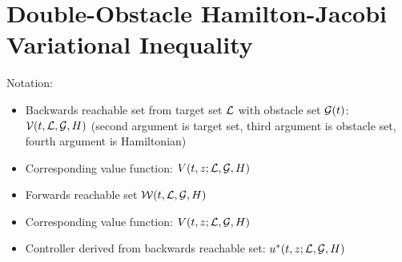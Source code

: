 \section{Double-Obstacle Hamilton-Jacobi Variational Inequality \label{sec:HJIVI}}
Notation:
\begin{itemize}
\item Backwards reachable set from target set $\mathcal{L}$ with obstacle set $\mathcal{G}(t)$: $\mathcal{V}(t, \mathcal{L}, \mathcal{G}, H)$ (second argument is target set, third argument is obstacle set, fourth argument is Hamiltonian)
\item Corresponding value function: $V(t, z; \mathcal{L}, \mathcal{G}, H)$
\item Forwards reachable set $\mathcal{W}(t, \mathcal{L}, \mathcal{G}, H)$
\item Corresponding value function: $V(t, z; \mathcal{L}, \mathcal{G}, H)$
\item Controller derived from backwards reachable set: $u^*(t, z; \mathcal{L}, \mathcal{G}, H)$
\end{itemize}